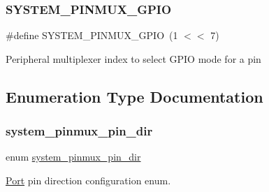 \subsubsection{\texorpdfstring{SYSTEM\_PINMUX\_GPIO}{SYSTEM\_PINMUX\_GPIO}}
{\footnotesize\ttfamily \#define S\+Y\+S\+T\+E\+M\+\_\+\+P\+I\+N\+M\+U\+X\+\_\+\+G\+P\+IO~(1 $<$$<$ 7)}

Peripheral multiplexer index to select G\+P\+IO mode for a pin 

\subsection{Enumeration Type Documentation}
\mbox{\label{group__asfdoc__sam0__system__pinmux__group_gaef5ed797ec6ce6e7f2ca4bafd3f77df2}} 
\subsubsection{\texorpdfstring{system\_pinmux\_pin\_dir}{system\_pinmux\_pin\_dir}}
{\footnotesize\ttfamily enum \mbox{\hyperlink{group__asfdoc__sam0__system__pinmux__group_gaef5ed797ec6ce6e7f2ca4bafd3f77df2}{system\+\_\+pinmux\+\_\+pin\+\_\+dir}}}



\mbox{\hyperlink{struct_port}{Port}} pin direction configuration enum. 


